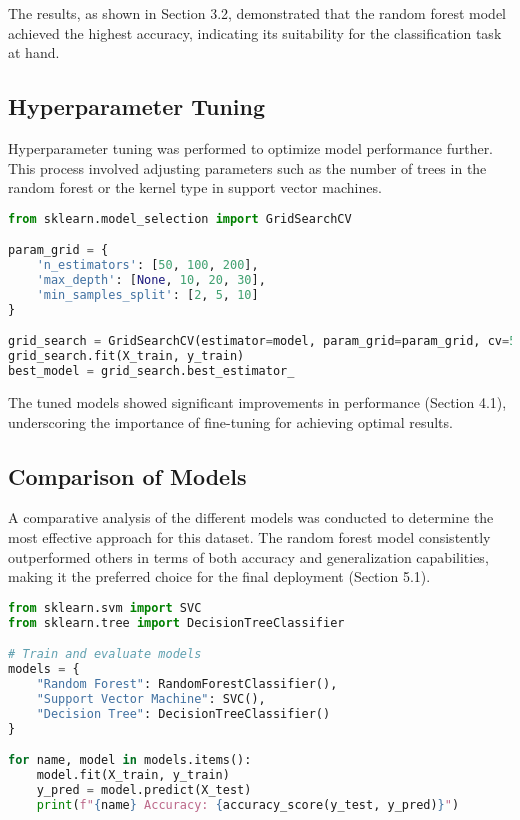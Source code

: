 \documentclass{article}
\begin{document}
The results, as shown in Section 3.2, demonstrated that the random forest model achieved the highest accuracy, indicating its suitability for the classification task at hand.

\subsection{Hyperparameter Tuning}

Hyperparameter tuning was performed to optimize model performance further. This process involved adjusting parameters such as the number of trees in the random forest or the kernel type in support vector machines.

\begin{lstlisting}[language=Python, caption=Hyperparameter Tuning with GridSearchCV, label=code:hyperparameter_tuning]
from sklearn.model_selection import GridSearchCV

param_grid = {
    'n_estimators': [50, 100, 200],
    'max_depth': [None, 10, 20, 30],
    'min_samples_split': [2, 5, 10]
}

grid_search = GridSearchCV(estimator=model, param_grid=param_grid, cv=5, n_jobs=-1, verbose=2)
grid_search.fit(X_train, y_train)
best_model = grid_search.best_estimator_
\end{lstlisting}

The tuned models showed significant improvements in performance (Section 4.1), underscoring the importance of fine-tuning for achieving optimal results.

\subsection{Comparison of Models}

A comparative analysis of the different models was conducted to determine the most effective approach for this dataset. The random forest model consistently outperformed others in terms of both accuracy and generalization capabilities, making it the preferred choice for the final deployment (Section 5.1).

\begin{lstlisting}[language=Python, caption=Comparison of Model Performances, label=code:model_comparison]
from sklearn.svm import SVC
from sklearn.tree import DecisionTreeClassifier

# Train and evaluate models
models = {
    "Random Forest": RandomForestClassifier(),
    "Support Vector Machine": SVC(),
    "Decision Tree": DecisionTreeClassifier()
}

for name, model in models.items():
    model.fit(X_train, y_train)
    y_pred = model.predict(X_test)
    print(f"{name} Accuracy: {accuracy_score(y_test, y_pred)}")
\end{lstlisting}
\end{document}
